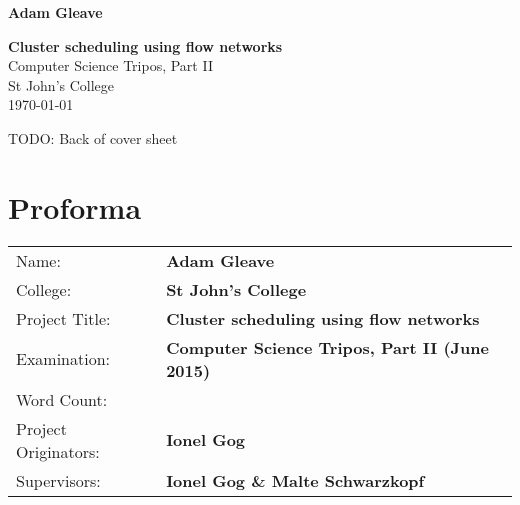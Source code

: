 \documentclass[12pt,a4paper,twoside,notitlepage]{report}
\theoremstyle{plain}
\theoremstyle{definition}
\theoremstyle{remark}
\begin{document}
\nocite{*}                      %

\pagestyle{empty}

\hfill{\large \bf Adam Gleave}

\vspace*{30mm}

\begin{center}
	{\LARGE \textbf{Cluster scheduling using flow networks}} \\
    \large
	\vspace*{5mm}
	Computer Science Tripos, Part II \\
	\vspace*{5mm}
	St John's College \\
	\vspace*{5mm}
	\today
\end{center}
\clearpage
\vspace*{\fill}

TODO: Back of cover sheet

\vspace*{\fill}


\setcounter{page}{1}
\pagestyle{plain}
\chapter*{Proforma}
\vspace*{-2em}
{
	\begin{tabular}{ll}
		Name:			& \textbf{Adam Gleave}					\\
		College:		& \textbf{St John's College}\\
    Project Title:	& \textbf{Cluster scheduling using flow networks}\\
		Examination:	& \textbf{Computer Science Tripos, Part II (June 2015)}\\
    Word Count:		& \textbf{ \unskip}\\
		Project Originators:	& \textbf{Ionel Gog}\\
    Supervisors:	& \textbf{Ionel Gog \& Malte Schwarzkopf}\\
	\end{tabular}
}

\renewcommand{\arraystretch}{1.3}
\vspace*{-1em}
\end{document}
